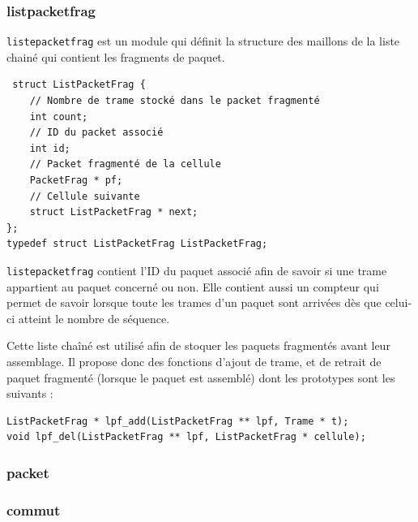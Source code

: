 \documentclass[a4paper,11pt]{article}
\begin{document}
\subsubsection{listpacketfrag}
\texttt{listepacketfrag} est un module qui définit la structure des
maillons de la liste chainé qui contient les fragments de paquet.
\begin{verbatim}
 struct ListPacketFrag {
    // Nombre de trame stocké dans le packet fragmenté
    int count;
    // ID du packet associé
    int id;
    // Packet fragmenté de la cellule
    PacketFrag * pf;
    // Cellule suivante
    struct ListPacketFrag * next;
};
typedef struct ListPacketFrag ListPacketFrag;
\end{verbatim}
\texttt{listepacketfrag} contient l'ID du paquet associé afin de savoir
si une trame appartient au paquet concerné ou non. Elle contient aussi
un compteur qui permet de savoir lorsque toute les trames d'un paquet
sont arrivées dès que celui-ci atteint le nombre de séquence.

Cette liste chaîné est utilisé afin de stoquer les paquets fragmentés
avant leur assemblage. Il propose donc des fonctions d'ajout de trame,
et de retrait de paquet fragmenté (lorsque le paquet est assemblé) dont
les prototypes sont les suivants :
\begin{verbatim}
ListPacketFrag * lpf_add(ListPacketFrag ** lpf, Trame * t);
void lpf_del(ListPacketFrag ** lpf, ListPacketFrag * cellule);
\end{verbatim}


\subsubsection{packet}


\subsubsection{commut}
\end{document}
